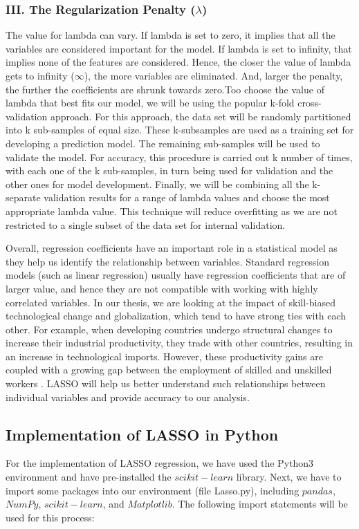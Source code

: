 \subsubsection{III. The Regularization Penalty ($\lambda$)}
\hspace{20pt}The value for lambda can vary. If lambda is set to zero, it implies that all the variables are considered important for the model. If lambda is set to infinity, that implies none of the features are considered. Hence, the closer the value of lambda gets to infinity ($\infty$), the more variables are eliminated. And, larger the penalty, the further the coefficients are shrunk towards zero.Too choose the value of lambda that best fits our model, we will be using the popular k-fold cross-validation approach. For this approach, the data set will be randomly partitioned into k sub-samples of equal size. These k-subsamples are used as a training set for developing a prediction model. The remaining sub-samples will be used to validate the model. For accuracy, this procedure is carried out k number of times, with each one of the k sub-samples, in turn being used for validation and the other ones for model development. Finally, we will be combining all the k-separate validation results for a range of lambda values and choose the most appropriate lambda value. This technique will reduce overfitting as we are not restricted to a single subset of the data set for internal validation.

Overall, regression coefficients have an important role in a statistical model as they help us identify the relationship between variables. Standard regression models (such as linear regression) usually have regression coefficients that are of larger value, and hence they are not compatible with working with highly correlated variables. In our thesis, we are looking at the impact of skill-biased technological change and globalization, which tend to have strong ties with each other. For example, when developing countries undergo structural changes to increase their industrial productivity, they trade with other countries, resulting in an increase in technological imports. However, these productivity gains are coupled with a growing gap between the employment of skilled and unskilled workers \cite{srour2013skill}. LASSO will help us better understand such relationships between individual variables and provide accuracy to our analysis.

\subsection{Implementation of LASSO in Python}
\hspace{20pt}For the implementation of LASSO regression, we have used the Python3 environment and have pre-installed the $scikit-learn$ library. Next, we have to import some packages into our environment (file Lasso.py), including $pandas$, $NumPy$, $scikit-learn$, and $Matplotlib$. The following import statements will be used for this process:

